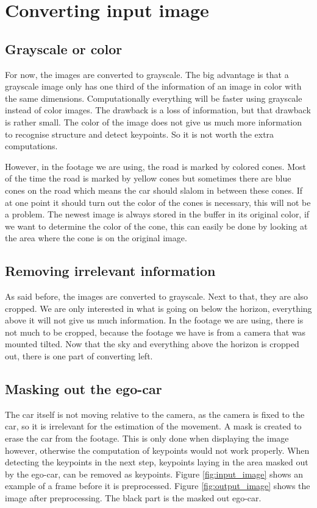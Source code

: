 \section{Converting input image}
\subsection{Grayscale or color}
For now, the images are converted to grayscale. The big advantage is that a grayscale image only has one third of the information of an image in color with the same dimensions. Computationally everything will be faster using grayscale instead of color images. The drawback is a loss of information, but that drawback is rather small. The color of the image does not give us much more information to recognise structure and detect keypoints. So it is not worth the extra computations.\bigskip

However, in the footage we are using, the road is marked by colored cones. Most of the time the road is marked by yellow cones but sometimes there are blue cones on the road which means the car should slalom in between these cones. If at one point it should turn out the color of the cones is necessary, this will not be a problem. The newest image is always stored in the buffer in its original color, if we want to determine the color of the cone, this can easily be done by looking at the area where the cone is on the original image.

\subsection{Removing irrelevant information}\label{ssec:irrelevant}
As said before, the images are converted to grayscale. Next to that, they are also cropped. We are only interested in what is going on below the horizon, everything above it will not give us much information. In the footage we are using, there is not much to be cropped, because the footage we have is from a camera that was mounted tilted. Now that the sky and everything above the horizon is cropped out, there is one part of converting left.

\subsection{Masking out the ego-car}
\label{ssec:egocar}
The car itself is not moving relative to the camera, as the camera is fixed to the car, so it is irrelevant for the estimation of the movement. A mask is created to erase the car from the footage. This is only done when displaying the image however, otherwise the computation of keypoints would not work properly. When detecting the keypoints in the next step, keypoints laying in the area masked out by the ego-car, can be removed as keypoints. Figure \autoref{fig:input_image} shows an example of a frame before it is preprocessed. Figure \autoref{fig:output_image} shows the image after preprocessing. The black part is the masked out ego-car.

